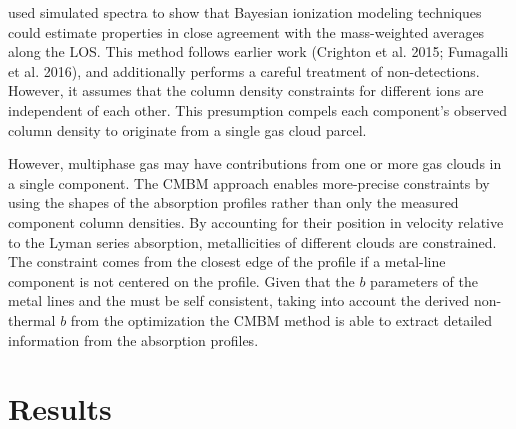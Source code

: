 \documentclass[fleqn,usenatbib]{mnras}
\begin{document}
\cite{liang2018Observing} used simulated spectra to show that Bayesian ionization modeling techniques could estimate properties in close agreement with the  mass-weighted averages along the LOS.
This method follows earlier work (Crighton et al. 2015; Fumagalli et al. 2016), and additionally performs a careful treatment of non-detections.
However, it assumes that the column density constraints for different ions are independent of each other.
This presumption compels each component's observed column density to originate from a single gas cloud parcel.

However, multiphase gas may have contributions from one or more gas clouds in a single component.
The CMBM approach enables more-precise constraints by using the shapes of the absorption profiles rather than only the measured component column densities.
By accounting for their position in velocity relative to the Lyman series absorption, metallicities of different clouds are constrained.
The constraint comes from the closest edge of the  profile if a metal-line component is not centered on the  profile.
Given that the $b$ parameters of the metal lines and the  must be self consistent, taking into account the derived non-thermal $b$ from the optimization the CMBM method is able to extract detailed information from the absorption profiles.

\section{Results}
\label{s: results}
\end{document}
